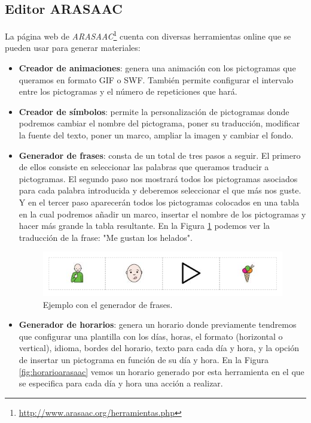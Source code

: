 \subsection{Editor ARASAAC}
\label{cap2:sec:editor}
La página web de \textit{ARASAAC}\footnote{\url{http://www.arasaac.org/herramientas.php}} cuenta con diversas herramientas online que se pueden usar para generar materiales:
\begin{itemize}
\item \textbf{Creador de animaciones}: genera una animación con los pictogramas que queramos en formato GIF o SWF. También permite configurar el intervalo entre los pictogramas y el número de repeticiones que hará.

\item \textbf{Creador de símbolos}: permite la personalización de pictogramas donde podremos cambiar el nombre del pictograma, poner su traducción, modificar la fuente del texto, poner un marco, ampliar la imagen y cambiar el fondo.

\item \textbf{Generador de frases}: consta de un total de tres pasos a seguir. El primero de ellos consiste en seleccionar las palabras que queramos traducir a pictogramas. El segundo paso nos mostrará todos los pictogramas asociados para cada palabra introducida y deberemos seleccionar el que más nos guste. Y en el tercer paso aparecerán todos los pictogramas colocados en una tabla en la cual podremos añadir un marco, insertar el nombre de los pictogramas y hacer más grande la tabla resultante. En la Figura \ref{fig:frase-arasaac} podemos ver la traducción de la frase: "Me gustan los helados".


\begin{figure}[h!]
	\centering
	\includegraphics[width=0.7\linewidth]{Imagenes/Bitmap/Frase ARASAAC}
	\caption{Ejemplo con el generador de frases.}
	\label{fig:frase-arasaac}
\end{figure}


\item \textbf{Generador de horarios}: genera un horario donde previamente tendremos que configurar una plantilla con los días, horas, el formato (horizontal o vertical), idioma, bordes del horario, texto para cada día y hora, y la opción de insertar un pictograma en función de su día y hora. En la Figura \ref{fig:horarioarasaac} vemos un horario generado por esta herramienta en el que se especifica para cada día y hora una acción a realizar.


\end{itemize}
